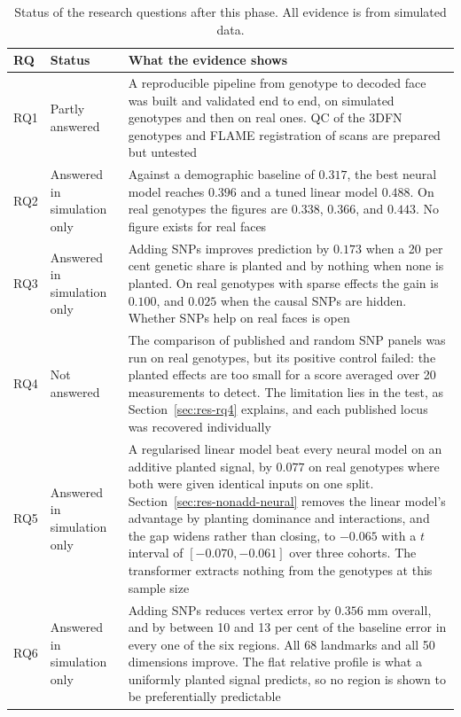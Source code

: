 \begin{table}[!ht]
\centering
\caption{Status of the research questions after this phase. All evidence is from simulated data.}
\label{tab:res-rq}
\small{}
\begin{tabular}{|P{1.1cm}|P{2.6cm}|P{10.6cm}|}
\hline
\textbf{RQ} & \textbf{Status} & \textbf{What the evidence shows} \\ \hline
RQ1 & Partly answered & A reproducible pipeline from genotype to decoded face was built and validated end to end, on simulated genotypes and then on real ones. QC of the 3DFN genotypes and FLAME registration of scans are prepared but untested \\ \hline
RQ2 & Answered in simulation only & Against a demographic baseline of $0.317$, the best neural model reaches $0.396$ and a tuned linear model $0.488$. On real genotypes the figures are $0.338$, $0.366$, and $0.443$. No figure exists for real faces \\ \hline
RQ3 & Answered in simulation only & Adding SNPs improves prediction by $0.173$ when a 20 per cent genetic share is planted and by nothing when none is planted. On real genotypes with sparse effects the gain is $0.100$, and $0.025$ when the causal SNPs are hidden. Whether SNPs help on real faces is open \\ \hline
RQ4 & Not answered & The comparison of published and random SNP panels was run on real genotypes, but its positive control failed: the planted effects are too small for a score averaged over 20 measurements to detect. The limitation lies in the test, as Section~\ref{sec:res-rq4} explains, and each published locus was recovered individually \\ \hline
RQ5 & Answered in simulation only & A regularised linear model beat every neural model on an additive planted signal, by $0.077$ on real genotypes where both were given identical inputs on one split. Section~\ref{sec:res-nonadd-neural} removes the linear model's advantage by planting dominance and interactions, and the gap widens rather than closing, to $-0.065$ with a $t$ interval of $[-0.070,-0.061]$ over three cohorts. The transformer extracts nothing from the genotypes at this sample size \\ \hline
RQ6 & Answered in simulation only & Adding SNPs reduces vertex error by $0.356$ mm overall, and by between 10 and 13 per cent of the baseline error in every one of the six regions. All 68 landmarks and all 50 dimensions improve. The flat relative profile is what a uniformly planted signal predicts, so no region is shown to be preferentially predictable \\ \hline

\end{tabular}
\end{table}
